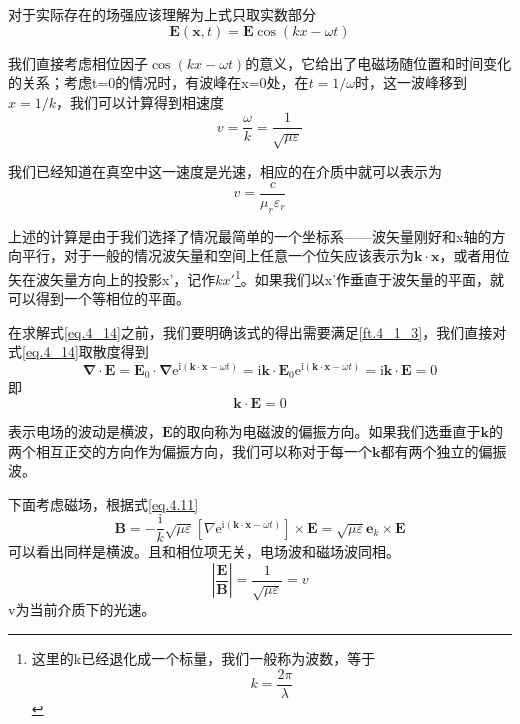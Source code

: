         对于实际存在的场强应该理解为上式只取实数部分
        \begin{equation}
            \label{eq.4_14}
            \boldsymbol{E}(\boldsymbol{x}, t)= \boldsymbol{E} \cos(kx-\omega t)
        \end{equation}

        我们直接考虑相位因子$\cos (kx - \omega t)$的意义，它给出了电磁场随位置和时间变化的关系；考虑t=0的情况时，有波峰在x=0处，在$t=1/\omega$时，这一波峰移到$x=1/k$，我们可以计算得到相速度
        \begin{equation}
            \label{eq.4_16}
            v=\frac{\omega}{k}=\frac{1}{\sqrt{\mu \varepsilon}}
        \end{equation}    

        我们已经知道在真空中这一速度是光速，相应的在介质中就可以表示为
        \begin{equation}
            v=\frac{c}{\mu_r \varepsilon_r}
        \end{equation}

        上述的计算是由于我们选择了情况最简单的一个坐标系——波矢量刚好和x轴的方向平行，对于一般的情况波矢量和空间上任意一个位矢应该表示为$\boldsymbol{k} \cdot \boldsymbol{x}$，或者用位矢在波矢量方向上的投影x'，记作$k x'$\footnote{这里的k已经退化成一个标量，我们一般称为波数，等于\[k= \frac{2 \pi}{\lambda}\]}。如果我们以x’作垂直于波矢量的平面，就可以得到一个等相位的平面。
        
        在求解式\ref{eq.4_14}之前，我们要明确该式的得出需要满足\ref{ft.4_1_3}，我们直接对式\ref{eq.4_14}取散度得到
        \begin{equation}
            \boldsymbol{\nabla} \cdot \boldsymbol{E}=\boldsymbol{E}_{0} \cdot \boldsymbol{\nabla} \mathrm{e}^{\mathrm{i}(\boldsymbol{k} \cdot \boldsymbol{x}-\omega t)}=\mathrm{i} \boldsymbol{k} \cdot \boldsymbol{E}_{0} \mathrm{e}^{\mathrm{i}(\boldsymbol{k} \cdot \boldsymbol{x}-\omega t)}=\mathrm{i} \boldsymbol{k} \cdot \boldsymbol{E}=0
        \end{equation} 
        即
        \begin{equation}
            \boldsymbol{k} \cdot \boldsymbol{E} = 0
        \end{equation}

        表示电场的波动是横波，$\boldsymbol{E}$的取向称为电磁波的偏振方向。如果我们选垂直于$\boldsymbol{k}$的两个相互正交的方向作为偏振方向，我们可以称对于每一个$\boldsymbol{k}$都有两个独立的偏振波。

        下面考虑磁场，根据式\ref{eq.4.11}
        \begin{equation}
            \boldsymbol{B} = -\frac{\mathrm{i}}{k} \sqrt{\mu \varepsilon} [\nabla \mathrm{e}^{\mathrm{i}(\boldsymbol{k} \cdot \boldsymbol{x}-\omega t)}] \times \boldsymbol{E} = \sqrt{\mu \varepsilon}\boldsymbol{e}_k \times \boldsymbol{E}
        \end{equation}
        可以看出同样是横波。且和相位项无关，电场波和磁场波同相。
        \begin{equation}
            \label{eq.4_20}
            \left|\frac{\boldsymbol{E}}{\boldsymbol{B}}\right|=\frac{1}{\sqrt{\mu \varepsilon}}=v
        \end{equation}
        v为当前介质下的光速。
